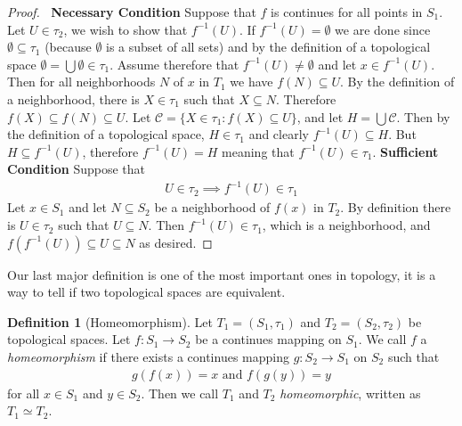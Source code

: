 \documentclass{article}
\theoremstyle{plain}
\theoremstyle{definition}
\newtheorem{definition}[theorem]{Definition}
\begin{document}
\begin{proof}$\ $\newline
	\textbf{Necessary Condition}\newline
	Suppose that $f$ is continues for all points in $S_1$. Let
	$U\in \tau_2$, we wish to show that $f^{-1}(U)$. If
	$f^{-1}(U)=\emptyset$ we are done since $\emptyset\subseteq\tau_1$
	(because $\emptyset$ is a subset of all sets) and by the
	definition of a topological space $\emptyset=\bigcup \emptyset
	\in \tau_1$. Assume therefore that $f^{-1}(U)\neq\emptyset$
	and let $x\in f^{-1}(U)$. Then for all neighborhoods $N$ of $x$ in $T_1$
	we have $f(N)\subseteq U$. By the definition of a neighborhood, there is
	$X\in\tau_1$ such that $X\subseteq N$. Therefore $f(X)\subseteq
	f(N)\subseteq U$. Let $\mathcal{C}=\{X\in\tau_1:f(X)\subseteq U\}$, and let
	$H=\bigcup\mathcal{C}$. Then by the definition of a topological space,
	$H\in\tau_1$ and clearly $f^{-1}(U)\subseteq H$. But $H\subseteq f^{-1}(U)$,
	therefore $f^{-1}(U)=H$ meaning that $f^{-1}(U)\in\tau_1$.
	\newline\newline
	\textbf{Sufficient Condition}\newline
	Suppose that
	\begin{equation}
	\begin{aligned}
		U\in \tau_2 \implies f^{-1}(U)\in \tau_1
	\end{aligned}
	\end{equation}
	Let $x\in S_1$ and let $N\subseteq S_2$ be a neighborhood of
	$f(x)$ in $T_2$. By definition there is $U\in\tau_2$ such
	that $U\subseteq N$. Then $f^{-1}(U)\in\tau_1$, which is a
	neighborhood, and $f(f^{-1}(U))\subseteq U\subseteq N$ as desired.
\end{proof}
Our last major definition is one of the most important ones in topology,
it is a way to tell if two topological spaces are equivalent.
\begin{definition}[Homeomorphism]\label{homeomorphism}
	Let $T_1=(S_1,\tau_1)$ and $T_2=(S_2,\tau_2)$ be topological spaces. Let
	$f:S_1\rightarrow S_2$ be a continues mapping on $S_1$. We call $f$ a
	\textit{homeomorphism} if there exists a continues mapping $g:S_2\rightarrow
	S_1$ on $S_2$ such that
	\begin{equation}
	\begin{aligned}
		g(f(x))=x \text{ and } f(g(y))=y
	\end{aligned}
	\end{equation}
	for all $x\in S_1$ and $y\in S_2$. Then we call $T_1$ and $T_2$
	\textit{homeomorphic}, written as $T_1 \simeq T_2$.
\end{definition}
\end{document}
